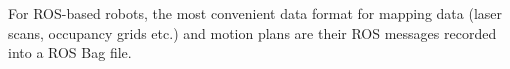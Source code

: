     For ROS-based robots, the most convenient data format for mapping data (laser scans, occupancy grids etc.) and motion plans are their ROS messages recorded into a ROS Bag file.
  
%   
% 
% 
% 
% 
